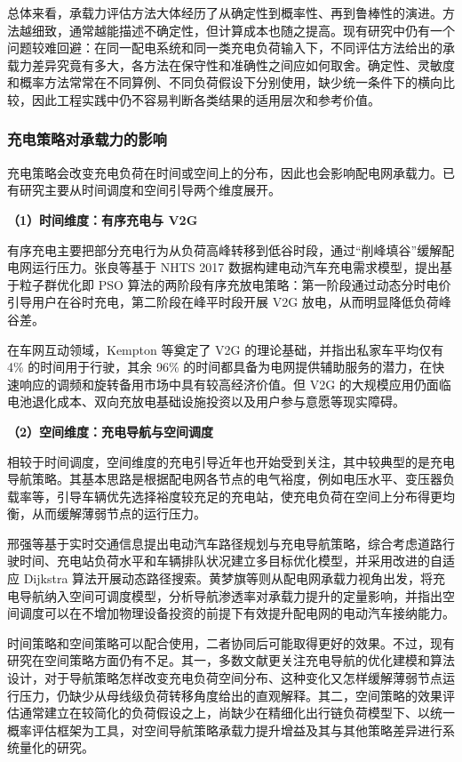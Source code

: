 \documentclass[10pt,a4paper]{article}
\numberwithin{equation}{section}
\numberwithin{table}{section}
\numberwithin{figure}{section}
\begin{document}
    总体来看，承载力评估方法大体经历了从确定性到概率性、再到鲁棒性的演进。方法越细致，通常越能描述不确定性，但计算成本也随之提高。现有研究中仍有一个问题较难回避：在同一配电系统和同一类充电负荷输入下，不同评估方法给出的承载力差异究竟有多大，各方法在保守性和准确性之间应如何取舍。确定性、灵敏度和概率方法常常在不同算例、不同负荷假设下分别使用，缺少统一条件下的横向比较，因此工程实践中仍不容易判断各类结果的适用层次和参考价值。

    \subsubsection{充电策略对承载力的影响}

    充电策略会改变充电负荷在时间或空间上的分布，因此也会影响配电网承载力。已有研究主要从时间调度和空间引导两个维度展开。

    \noindent\textbf{（1）时间维度：有序充电与 V2G}

    有序充电主要把部分充电行为从负荷高峰转移到低谷时段，通过“削峰填谷”缓解配电网运行压力。张良等\supercite{ref19}基于 NHTS 2017 数据构建电动汽车充电需求模型，提出基于粒子群优化即 PSO 算法的两阶段有序充放电策略：第一阶段通过动态分时电价引导用户在谷时充电，第二阶段在峰平时段开展 V2G 放电，从而明显降低负荷峰谷差。

    在车网互动领域，Kempton 等\supercite{ref20}奠定了 V2G 的理论基础，并指出私家车平均仅有 4\% 的时间用于行驶，其余 96\% 的时间都具备为电网提供辅助服务的潜力，在快速响应的调频和旋转备用市场中具有较高经济价值。但 V2G 的大规模应用仍面临电池退化成本、双向充放电基础设施投资以及用户参与意愿等现实障碍。

    \noindent\textbf{（2）空间维度：充电导航与空间调度}

    相较于时间调度，空间维度的充电引导近年也开始受到关注，其中较典型的是充电导航策略。其基本思路是根据配电网各节点的电气裕度，例如电压水平、变压器负载率等，引导车辆优先选择裕度较充足的充电站，使充电负荷在空间上分布得更均衡，从而缓解薄弱节点的运行压力。

    邢强等\supercite{ref21}基于实时交通信息提出电动汽车路径规划与充电导航策略，综合考虑道路行驶时间、充电站负荷水平和车辆排队状况建立多目标优化模型，并采用改进的自适应 Dijkstra 算法开展动态路径搜索。黄梦旗等\supercite{ref17}则从配电网承载力视角出发，将充电导航纳入空间可调度模型，分析导航渗透率对承载力提升的定量影响，并指出空间调度可以在不增加物理设备投资的前提下有效提升配电网的电动汽车接纳能力。

    时间策略和空间策略可以配合使用，二者协同后可能取得更好的效果。不过，现有研究在空间策略方面仍有不足。其一，多数文献更关注充电导航的优化建模和算法设计，对于导航策略怎样改变充电负荷空间分布、这种变化又怎样缓解薄弱节点运行压力，仍缺少从母线级负荷转移角度给出的直观解释。其二，空间策略的效果评估通常建立在较简化的负荷假设之上，尚缺少在精细化出行链负荷模型下、以统一概率评估框架为工具，对空间导航策略承载力提升增益及其与其他策略差异进行系统量化的研究。
\end{document}
